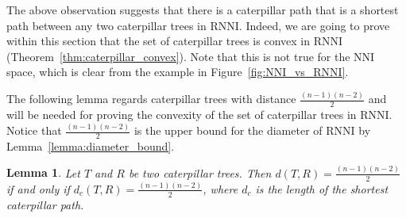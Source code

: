 \documentclass{amsart}
\newcommand{\nni}{\mathrm{NNI}}
\newcommand{\rnni}{\mathrm{RNNI}}
\newtheorem{lemma}[definition]{Lemma}
\begin{document}
The above observation suggests that there is a caterpillar path that is a shortest path between any two caterpillar trees in $\rnni$.
Indeed, we are going to prove within this section that the set of caterpillar trees is convex in $\rnni$ (Theorem~\ref{thm:caterpillar_convex}).
Note that this is not true for the $\nni$ space, which is clear from the example in Figure~\ref{fig:NNI_vs_RNNI}.

The following lemma regards caterpillar trees with distance $\frac{(n-1)(n-2)}{2}$ and will be needed for proving the convexity of the set of caterpillar trees in $\rnni$.
Notice that $\frac{(n-1)(n-2)}{2}$ is the upper bound for the diameter of $\rnni$ by Lemma~\ref{lemma:diameter_bound}.

\begin{lemma}
Let $T$ and $R$ be two caterpillar trees.
Then $d(T,R) = \frac{(n-1)(n-2)}{2}$ if and only if $d_c(T,R) = \frac{(n-1)(n-2)}{2}$, where $d_c$ is the length of the shortest caterpillar path.
\label{lemma:caterpillar_dist=diameter}
\end{lemma}
\end{document}
